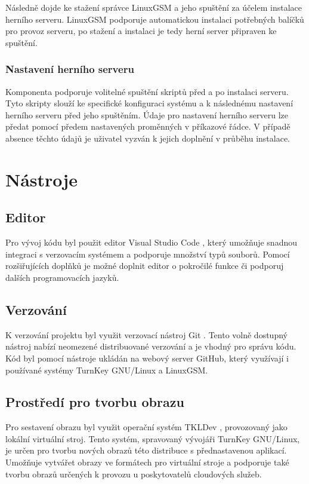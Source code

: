 Následně dojde ke stažení správce LinuxGSM a jeho spuštění za účelem instalace herního serveru. LinuxGSM podporuje automatickou instalaci
potřebných balíčků pro provoz serveru, po stažení a instalaci je tedy herní server připraven ke spuštění.

\subsubsection{Nastavení herního serveru}

Komponenta podporuje volitelné spuštění skriptů před a po instalaci serveru. Tyto skripty slouží
ke specifické konfiguraci systému a k následnému nastavení herního serveru před jeho spuštěním.
Údaje pro nastavení herního serveru lze předat pomocí předem nastavených proměnných v příkazové řádce. V případě absence těchto údajů
je uživatel vyzván k jejich doplnění v průběhu instalace.


\section{Nástroje}

\subsection{Editor}

Pro vývoj kódu byl použit editor Visual Studio Code \cite{vscode}, který umožňuje snadnou integraci s verzovacím systémem
a podporuje množství typů souborů. Pomocí rozšiřujících doplňků je možné doplnit editor o pokročilé funkce či podporuj
dalších programovacích jazyků.

\subsection{Verzování}

K verzování projektu byl využit verzovací nástroj Git \cite{git}. Tento volně dostupný nástroj nabízí
neomezené distribuované verzování a je vhodný pro správu kódu.
Kód byl pomocí nástroje ukládán na webový server GitHub, který využívají i používané systémy TurnKey GNU/Linux
a LinuxGSM.

\subsection{Prostředí pro tvorbu obrazu}

Pro sestavení obrazu byl využit operační systém TKLDev \cite{tkldev}, provozovaný jako lokální virtuální stroj. Tento systém, spravovaný vývojáři TurnKey GNU/Linux,
je určen pro tvorbu nových obrazů této distribuce s přednastavenou aplikací. Umožňuje vytvářet obrazy ve formátech pro virtuální stroje a podporuje
také tvorbu obrazů určených k provozu u poskytovatelů cloudových služeb.

